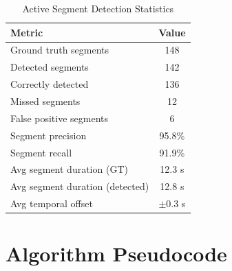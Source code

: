 \documentclass[11pt,a4paper]{article}
\begin{document}
\begin{table}[htbp]
\centering
\caption{Active Segment Detection Statistics}
\begin{tabular}{@{}lc@{}}
\toprule
\textbf{Metric} & \textbf{Value} \\ \midrule
Ground truth segments & 148 \\
Detected segments & 142 \\
Correctly detected & 136 \\
Missed segments & 12 \\
False positive segments & 6 \\
\midrule
Segment precision & 95.8\% \\
Segment recall & 91.9\% \\
\midrule
Avg segment duration (GT) & 12.3 s \\
Avg segment duration (detected) & 12.8 s \\
Avg temporal offset & $\pm$0.3 s \\
\bottomrule
\end{tabular}
\end{table}

\section{Algorithm Pseudocode}
\end{document}
